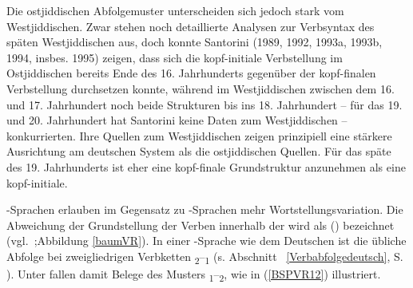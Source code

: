  

 
 Die ostjiddischen Abfolgemuster unterscheiden sich jedoch stark vom Westjiddischen. Zwar stehen noch detaillierte Analysen zur Verbsyntax des späten Westjiddischen aus, doch konnte Santorini (1989, 1992, 1993a, 1993b, 1994, insbes. 1995) zeigen, dass sich die kopf-initiale Verbstellung im Ostjiddischen bereits Ende des 16. Jahrhunderts gegenüber der kopf-finalen Verbstellung durchsetzen konnte, während im Westjiddischen zwischen dem  16. und 17. Jahrhundert noch beide Strukturen bis ins 18. Jahrhundert – für das 19. und 20. Jahrhundert hat Santorini keine Daten zum Westjiddischen – konkurrierten. Ihre Quellen zum Westjiddischen zeigen prinzipiell eine stärkere Ausrichtung am deutschen System als die ostjiddischen Quellen. Für das späte  des 19. Jahrhunderts ist eher eine kopf-finale Grundstruktur anzunehmen als eine kopf-initiale.


 \hai{{\OV}}-Sprachen erlauben im Gegensatz zu \hai{{\VO}}-Sprachen mehr Wortstellungsvariation. Die Abweichung der Grundstellung der Verben innerhalb der \hai{{\RSK}} wird als  (\hai{{\VR}}) bezeichnet (vgl.\, \citealt{Evers1975};Abbildung \ref{baumVR}). In einer \hai{{\OV}}-Sprache wie dem Deutschen ist die übliche Abfolge bei zweigliedrigen Verbketten \textsubscript{2}–\textsubscript{1} (s. Abschnitt \,%
 \ref{Verbabfolgedeutsch}, S.\, \pageref{Verbabfolgedeutsch}). Unter \hai{{\VR}} fallen damit Belege des Musters \textsubscript{1}–\textsubscript{2}, wie in (\ref{BSPVR12}) illustriert. 


